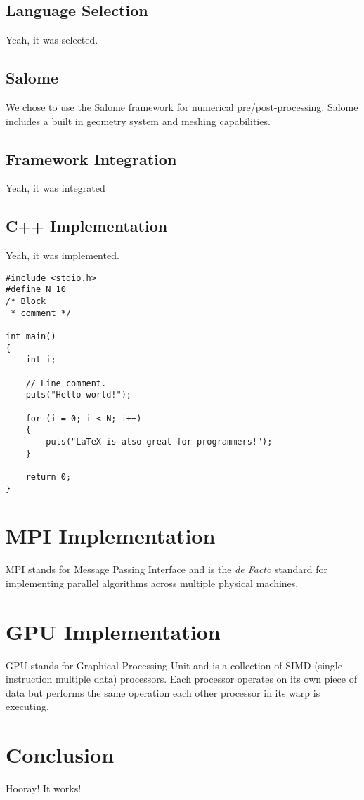 \documentclass{article}
\numberwithin{equation}{subsection}
\begin{document}
\subsection{Language Selection}
Yeah, it was selected.

\subsection{Salome}
We chose to use the Salome framework for numerical pre/post-processing. Salome includes a built in geometry system and meshing capabilities.

\subsection{Framework Integration}
Yeah, it was integrated

\subsection{C++ Implementation}
Yeah, it was implemented.

\begin{lstlisting}
#include <stdio.h>
#define N 10
/* Block
 * comment */

int main()
{
    int i;

    // Line comment.
    puts("Hello world!");
    
    for (i = 0; i < N; i++)
    {
        puts("LaTeX is also great for programmers!");
    }

    return 0;
}
\end{lstlisting}

\section{MPI Implementation}
MPI stands for Message Passing Interface and is the \textit{de Facto} standard for implementing parallel algorithms across multiple physical machines.

\section{GPU Implementation}
GPU stands for Graphical Processing Unit and is a collection of SIMD (single instruction multiple data) processors. Each processor operates on its own piece of data but performs the same operation each other processor in its warp is executing.

\section{Conclusion}
Hooray! It works!
\end{document}
